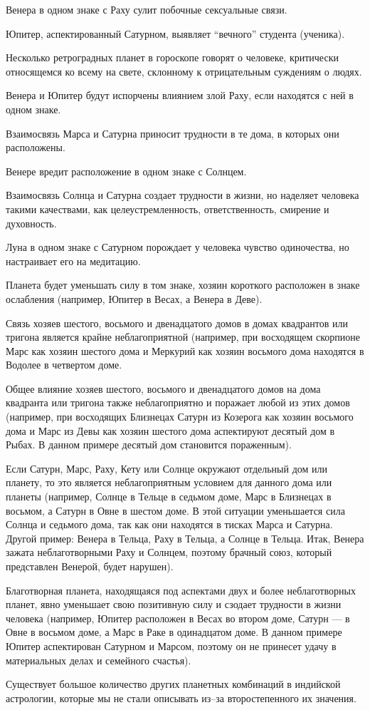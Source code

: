 Венера в одном знаке с Раху сулит побочные сексуальные связи.

Юпитер, аспектированный Сатурном, выявляет ``вечного'' студента (ученика).

Несколько ретроградных планет в гороскопе говорят о человеке, критически относящемся ко всему на свете, склонному к отрицательным суждениям о людях.

Венера и Юпитер будут испорчены влиянием злой Раху, если находятся с ней в одном знаке.

Взаимосвязь Марса и Сатурна приносит трудности в те дома, в которых они расположены.

Венере вредит расположение в одном знаке с Солнцем.

Взаимосвязь Солнца и Сатурна создает трудности в жизни, но наделяет человека такими качествами, как целеустремленность, ответственность, смирение и духовность.

Луна в одном знаке с Сатурном порождает у человека чувство одиночества, но настраивает его на медитацию.

Планета будет уменьшать силу в том знаке, хозяин короткого расположен в знаке ослабления (например, Юпитер в Весах, а Венера в Деве).

Связь хозяев шестого, восьмого и двенадцатого домов в домах квадрантов или тригона является крайне неблагоприятной (например, при восходящем скорпионе Марс как хозяин шестого дома и Меркурий как хозяин восьмого дома находятся в Водолее в четвертом доме.

Общее влияние хозяев шестого, восьмого и двенадцатого домов на дома квадранта или тригона также неблагоприятно и поражает любой из этих домов (например, при восходящих Близнецах Сатурн из Козерога как хозяин восьмого дома и Марс из Девы как хозяин шестого дома аспектируют десятый дом в Рыбах. В данном примере десятый дом становится пораженным).

Если Сатурн, Марс, Раху, Кету или Солнце окружают отдельный дом или планету, то это является неблагоприятным условием для данного дома или планеты (например, Солнце в Тельце в седьмом доме, Марс в Близнецах в восьмом, а Сатурн в Овне в шестом доме. В этой ситуации уменьшается сила Солнца и седьмого дома, так как они находятся в тисках Марса и Сатурна. Другой пример: Венера в  Тельца, Раху в  Тельца, а Солнце в  Тельца. Итак, Венера зажата неблаготворными Раху и Солнцем, поэтому брачный союз, который представлен Венерой, будет нарушен).

Благотворная планета, находящаяся под аспектами двух и более неблаготворных планет, явно уменьшает свою позитивную силу и сзодает трудности в жизни человека (например, Юпитер расположен в Весах во втором доме, Сатурн --- в Овне в восьмом доме, а Марс в Раке в одинадцатом доме. В данном примере Юпитер аспектирован Сатурном и Марсом, поэтому он не принесет удачу в материальных делах и семейного счастья).

Существует большое количество других планетных комбинаций в индийской астрологии, которые мы не стали описывать из--за второстепенного их значения.
